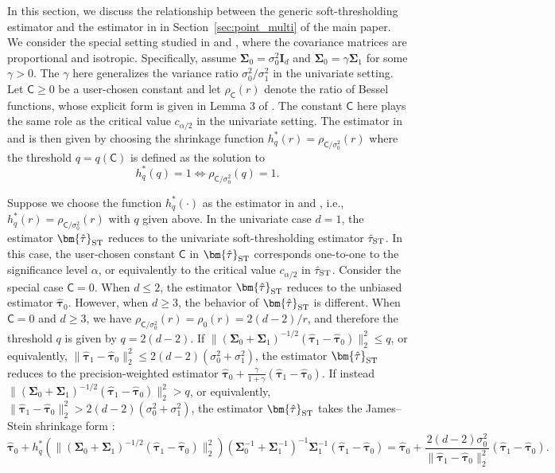 \documentclass[11pt]{article}
\newcommand{\htau}{\widehat\tau}
\numberwithin{equation}{section}
\theoremstyle{definition}
\begin{document}
In this section, we discuss the relationship between the generic soft-thresholding estimator and the estimator in \citet{j1981estimation, bickel1984parametric} in Section~\ref{sec:point_multi} of the main paper. We consider the special setting studied in \cite{j1981estimation} and \cite{bickel1984parametric}, where the covariance matrices are proportional and isotropic. Specifically, assume $\bm{\Sigma}_0 = \sigma_0^2 \bm{I}_d$ and $\bm{\Sigma}_0=\gamma\bm{\Sigma}_1$ for some $\gamma>0$. The $\gamma$ here generalizes the variance ratio $\sigma_0^2/\sigma_1^2$ in the univariate setting. Let $\mathsf C \ge 0$ be a user-chosen constant and let $\rho_{\mathsf C}(r)$ denote the ratio of Bessel functions, whose explicit form is given in Lemma 3 of \cite{j1981estimation}. The constant $\mathsf C$ here plays the same role as the critical value $c_{\alpha/2}$ in the univariate setting. The estimator in \cite{j1981estimation} and \cite{bickel1984parametric} is then given by choosing the shrinkage function $h_q^*(r) = \rho_{\mathsf C/\sigma_0^2}(r)$ where the threshold $q = q(\mathsf C)$ is defined as the solution to
\[
h_q^*(q) = 1 \iff \rho_{\mathsf C/\sigma_0^2}(q) = 1.
\]

Suppose we choose the function $h_q^*(\cdot)$ as the estimator in \cite{j1981estimation} and \cite{bickel1984parametric}, i.e., $h_q^*(r) = \rho_{\mathsf C/\sigma_0^2}(r)$ with $q$ given above. In the univariate case $d=1$, the estimator $\bm{\hat\tau}_{\rm ST}$ reduces to the univariate soft-thresholding estimator $\hat\tau_{\rm ST}$. In this case, the user-chosen constant $\mathsf C$ in $\bm{\hat\tau}_{\rm ST}$ corresponds one-to-one to the significance level $\alpha$, or equivalently to the critical value $c_{\alpha/2}$ in $\hat\tau_{\rm ST}$. Consider the special case $\mathsf C=0$. When $d \le 2$, the estimator $\bm{\hat\tau}_{\rm ST}$ reduces to the unbiased estimator $\bm{\hat\tau}_0$. However, when $d \ge 3$, the behavior of $\bm{\hat\tau}_{\rm ST}$ is different. When $\mathsf C=0$ and $d \ge 3$, we have $\rho_{\mathsf C/\sigma_0^2}(r) = \rho_0(r) = 2(d-2)/r$, and therefore the threshold $q$ is given by $q = 2(d-2)$. If $\lVert (\bm{\Sigma}_0+ \bm{\Sigma}_1)^{-1/2}(\bm{\htau}_1 - \bm{\htau}_0) \rVert_2^2 \le q$, or equivalently, $\lVert \bm{\htau}_1 - \bm{\htau}_0 \rVert_2^2 \le 2(d-2)(\sigma_0^2 + \sigma_1^2)$, the estimator $\bm{\hat\tau}_{\rm ST}$ reduces to the precision-weighted estimator $\bm{\htau}_0 + \frac{\gamma}{1+\gamma}(\bm{\htau}_1 - \bm{\htau}_0)$. If instead $\lVert (\bm{\Sigma}_0+ \bm{\Sigma}_1)^{-1/2}(\bm{\htau}_1 - \bm{\htau}_0) \rVert_2^2 > q$, or equivalently, $\lVert \bm{\htau}_1 - \bm{\htau}_0 \rVert_2^2 > 2(d-2)(\sigma_0^2 + \sigma_1^2)$, the estimator $\bm{\hat\tau}_{\rm ST}$ takes the James--Stein shrinkage form \citep{green1991james}:
\[
  \bm{\htau}_0 + h_q^*(\lVert (\bm{\Sigma}_0+ \bm{\Sigma}_1)^{-1/2}(\bm{\htau}_1 - \bm{\htau}_0) \rVert_2^2)(\bm{\Sigma}_0^{-1} + \bm{\Sigma}_1^{-1})^{-1}\bm{\Sigma}_1^{-1}(\bm{\htau}_1 - \bm{\htau}_0) = \bm{\htau}_0 + \frac{2(d-2)\sigma_0^2}{\lVert \bm{\htau}_1 - \bm{\htau}_0 \rVert_2^2}(\bm{\htau}_1 - \bm{\htau}_0).
\]
\end{document}
